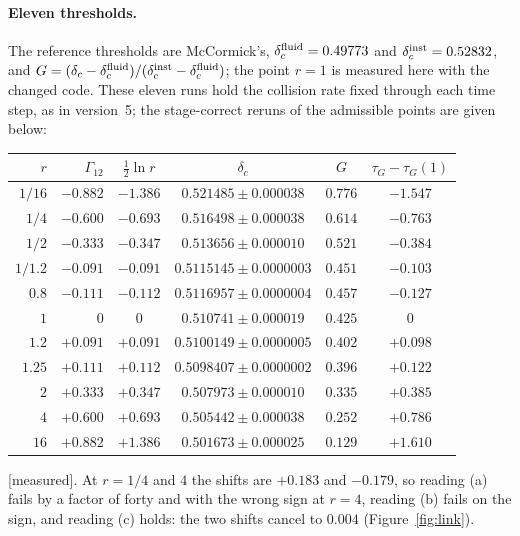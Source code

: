 \documentclass[11pt]{article}
\newcommand{\grade}[1]{\textsf{\small[#1]}}
\begin{document}
\paragraph{Eleven thresholds.} The reference thresholds are McCormick's, $\delta_c^{\rm fluid}=0.49773$ and $\delta_c^{\rm inst}=0.52832$, and $G=(\delta_c-\delta_c^{\rm fluid})/(\delta_c^{\rm inst}-\delta_c^{\rm fluid})$; the point $r=1$ is measured here with the changed code. These eleven runs hold the collision rate fixed through each time step, as in version~5; the stage-correct reruns of the admissible points are given below:
\begin{center}\begin{tabular}{rrcccc}\toprule
$r$ & $\Gamma_{12}$ & $\tfrac12\ln r$ & $\delta_c$ & $G$ & $\tau_G-\tau_G(1)$\\\midrule
$1/16$ & $-0.882$ & $-1.386$ & $0.521485\pm0.000038$ & $0.776$ & $-1.547$\\
$1/4$ & $-0.600$ & $-0.693$ & $0.516498\pm0.000038$ & $0.614$ & $-0.763$\\
$1/2$ & $-0.333$ & $-0.347$ & $0.513656\pm0.000010$ & $0.521$ & $-0.384$\\
$1/1.2$ & $-0.091$ & $-0.091$ & $0.5115145\pm0.0000003$ & $0.451$ & $-0.103$\\
$0.8$ & $-0.111$ & $-0.112$ & $0.5116957\pm0.0000004$ & $0.457$ & $-0.127$\\
$1$ & $0$ & $0$ & $0.510741\pm0.000019$ & $0.425$ & $0$\\
$1.2$ & $+0.091$ & $+0.091$ & $0.5100149\pm0.0000005$ & $0.402$ & $+0.098$\\
$1.25$ & $+0.111$ & $+0.112$ & $0.5098407\pm0.0000002$ & $0.396$ & $+0.122$\\
$2$ & $+0.333$ & $+0.347$ & $0.507973\pm0.000010$ & $0.335$ & $+0.385$\\
$4$ & $+0.600$ & $+0.693$ & $0.505442\pm0.000038$ & $0.252$ & $+0.786$\\
$16$ & $+0.882$ & $+1.386$ & $0.501673\pm0.000025$ & $0.129$ & $+1.610$\\\bottomrule\end{tabular}\end{center}
\grade{measured}. At $r=1/4$ and $4$ the shifts are $+0.183$ and $-0.179$, so reading (a) fails by a factor of forty and with the wrong sign at $r=4$, reading (b) fails on the sign, and reading (c) holds: the two shifts cancel to $0.004$ (Figure~\ref{fig:link}).
\end{document}
